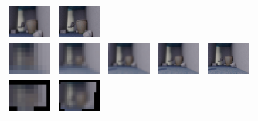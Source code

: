 \begin{figure}
\begin{center}
\begin{tabular}{c c c c c}
        \includegraphics[width=2.2cm]{main/chapter03/data/depth/img_j_4.jpg} &
        \includegraphics[width=2.2cm]{main/chapter03/data/depth/img_j_5.jpg} \\
        \includegraphics[width=2.2cm]{main/chapter03/data/depth/img_k_1.jpg} &
        \includegraphics[width=2.2cm]{main/chapter03/data/depth/img_k_2.jpg} &
        \includegraphics[width=2.2cm]{main/chapter03/data/depth/img_k_3.jpg} &
        \includegraphics[width=2.2cm]{main/chapter03/data/depth/img_k_4.jpg} &
        \includegraphics[width=2.2cm]{main/chapter03/data/depth/img_k_5.jpg} \\
        \includegraphics[width=2.2cm]{main/chapter03/data/depth/image_dst_to_src_avg_1.jpg} &
        \includegraphics[width=2.2cm]{main/chapter03/data/depth/image_dst_to_src_avg_2.jpg} &

\end{tabular}
\end{center}
\end{figure}
